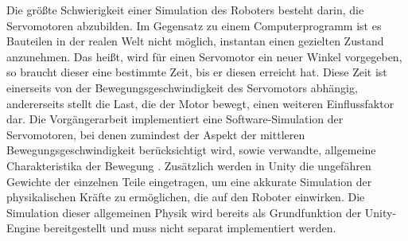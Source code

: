 Die größte Schwierigkeit einer Simulation des Roboters besteht darin, die Servomotoren abzubilden.
Im Gegensatz zu einem Computerprogramm ist es Bauteilen in der realen Welt nicht möglich, instantan einen gezielten Zustand anzunehmen.
Das heißt, wird für einen Servomotor ein neuer Winkel vorgegeben, so braucht dieser eine bestimmte Zeit, bis er diesen erreicht hat.
Diese Zeit ist einerseits von der Bewegungsgeschwindigkeit des Servomotors abhängig, andererseits stellt die Last, die der Motor bewegt, einen weiteren Einflussfaktor dar.
Die Vorgängerarbeit implementiert eine Software-Simulation der Servomotoren, bei denen zumindest der Aspekt der mittleren Bewegungsgeschwindigkeit berücksichtigt wird, sowie verwandte, allgemeine Charakteristika der Bewegung \cite[37]{waidner.2020}.
Zusätzlich werden in Unity die ungefähren Gewichte der einzelnen Teile eingetragen, um eine akkurate Simulation der physikalischen Kräfte zu ermöglichen, die auf den Roboter einwirken.
Die Simulation dieser allgemeinen Physik wird bereits als Grundfunktion der Unity-Engine bereitgestellt und muss nicht separat implementiert werden.

    

